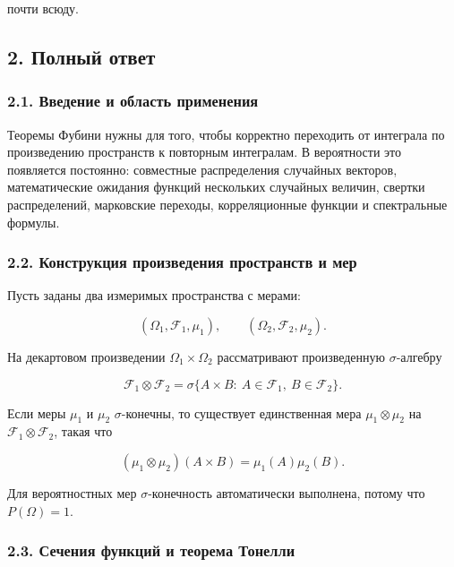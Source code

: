\documentclass[
  11pt,
  a4paper,
]{article}
\begin{document}
почти всюду.

\subsection{2. Полный
ответ}\label{ux43fux43eux43bux43dux44bux439-ux43eux442ux432ux435ux442}

\subsubsection{2.1. Введение и область
применения}\label{ux432ux432ux435ux434ux435ux43dux438ux435-ux438-ux43eux431ux43bux430ux441ux442ux44c-ux43fux440ux438ux43cux435ux43dux435ux43dux438ux44f}

Теоремы Фубини нужны для того, чтобы корректно переходить от интеграла
по произведению пространств к повторным интегралам. В вероятности это
появляется постоянно: совместные распределения случайных векторов,
математические ожидания функций нескольких случайных величин, свертки
распределений, марковские переходы, корреляционные функции и
спектральные формулы.

\subsubsection{2.2. Конструкция произведения пространств и
мер}\label{ux43aux43eux43dux441ux442ux440ux443ux43aux446ux438ux44f-ux43fux440ux43eux438ux437ux432ux435ux434ux435ux43dux438ux44f-ux43fux440ux43eux441ux442ux440ux430ux43dux441ux442ux432-ux438-ux43cux435ux440}

Пусть заданы два измеримых пространства с мерами:

\[
(\Omega_1,\mathcal F_1,\mu_1),
\qquad
(\Omega_2,\mathcal F_2,\mu_2).
\]

На декартовом произведении \(\Omega_1\times\Omega_2\) рассматривают
произведенную \(\sigma\)-алгебру

\[
\mathcal F_1\otimes\mathcal F_2
=
\sigma\{A\times B:\ A\in\mathcal F_1,\ B\in\mathcal F_2\}.
\]

Если меры \(\mu_1\) и \(\mu_2\) \(\sigma\)-конечны, то существует
единственная мера \(\mu_1\otimes\mu_2\) на
\(\mathcal F_1\otimes\mathcal F_2\), такая что

\[
(\mu_1\otimes\mu_2)(A\times B)=\mu_1(A)\mu_2(B).
\]

Для вероятностных мер \(\sigma\)-конечность автоматически выполнена,
потому что \(P(\Omega)=1\).

\subsubsection{2.3. Сечения функций и теорема
Тонелли}\label{ux441ux435ux447ux435ux43dux438ux44f-ux444ux443ux43dux43aux446ux438ux439-ux438-ux442ux435ux43eux440ux435ux43cux430-ux442ux43eux43dux435ux43bux43bux438}
\end{document}

